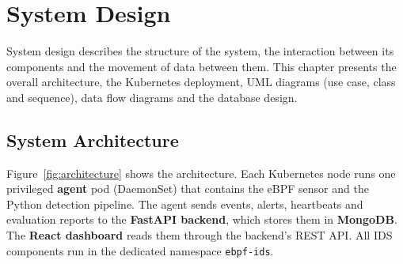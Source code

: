 \chapter{System Design}

System design describes the structure of the system, the interaction between its
components and the movement of data between them. This chapter presents the overall
architecture, the Kubernetes deployment, UML diagrams (use case, class and sequence),
data flow diagrams and the database design.

\section{System Architecture}

Figure~\ref{fig:architecture} shows the architecture. Each Kubernetes node runs one
privileged \textbf{agent} pod (DaemonSet) that contains the eBPF sensor and the Python
detection pipeline. The agent sends events, alerts, heartbeats and evaluation reports
to the \textbf{FastAPI backend}, which stores them in \textbf{MongoDB}. The \textbf{React
dashboard} reads them through the backend's REST API. All IDS components run in the
dedicated namespace \texttt{ebpf-ids}.

